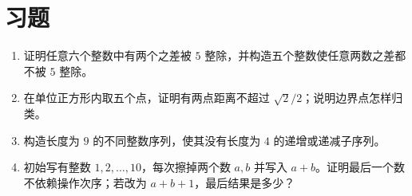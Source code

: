 \section{习题}
\begin{enumerate}
  \item\label{ex:pigeonhole-1} 证明任意六个整数中有两个之差被 $5$ 整除，并构造五个整数使任意两数之差都不被 $5$ 整除。
  \item\label{ex:pigeonhole-2} 在单位正方形内取五个点，证明有两点距离不超过 $\sqrt2/2$；说明边界点怎样归类。
  \item\label{ex:pigeonhole-3} 构造长度为 $9$ 的不同整数序列，使其没有长度为 $4$ 的递增或递减子序列。
  \item\label{ex:pigeonhole-4} 初始写有整数 $1,2,\ldots,10$，每次擦掉两个数 $a,b$ 并写入 $a+b$。证明最后一个数不依赖操作次序；若改为 $a+b+1$，最后结果是多少？
\end{enumerate}

